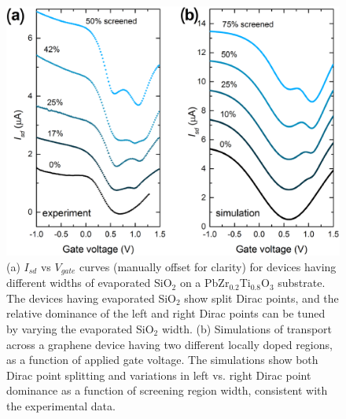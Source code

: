 \documentclass[edeposit,fullpage,draftthesis]{uiucthesis2009}
\begin{document}
\begin{figure}
  \centering
  \includegraphics[width=.8\textwidth]{images/resultsanddiscussion/pztpaper/figure2}

  \caption[I-V curves for graphene-ferroelectric pn junction devices]{
   (a) $I_{sd}$ vs $V_{gate}$ curves (manually offset for clarity) for devices having different widths of evaporated SiO$_2$ on a PbZr$_{0.2}$Ti$_{0.8}$O$_3$ substrate. The devices having evaporated SiO$_2$ show split Dirac points, and the relative dominance of the left and right Dirac points can be tuned by varying the evaporated SiO$_2$ width.
   (b) Simulations of transport across a graphene device having two different locally doped regions, as a function of applied gate voltage. The simulations show both Dirac point splitting and variations in left vs. right Dirac point dominance as a function of screening region width, consistent with the experimental data.
}
\label{fig:PZTdata}
\end{figure}
\end{document}
